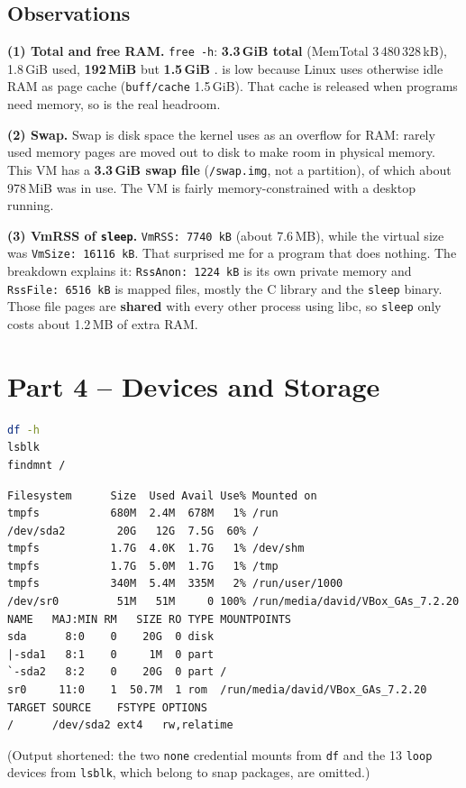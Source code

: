 \documentclass[12pt]{article}
\begin{document}
\subsection*{Observations}
\textbf{(1) Total and free RAM.} \texttt{free -h}: \textbf{3.3\,GiB total} (MemTotal 3\,480\,328\,kB), 1.8\,GiB used, \textbf{192\,MiB } but \textbf{1.5\,GiB }.  is low because Linux uses otherwise idle RAM as page cache (\texttt{buff/cache} 1.5\,GiB). That cache is released when programs need memory, so  is the real headroom.

\textbf{(2) Swap.} Swap is disk space the kernel uses as an overflow for RAM: rarely used memory pages are moved out to disk to make room in physical memory. This VM has a \textbf{3.3\,GiB swap file} (\texttt{/swap.img}, not a partition), of which about 978\,MiB was in use. The VM is fairly memory-constrained with a desktop running.

\textbf{(3) VmRSS of \texttt{sleep}.} \texttt{VmRSS: 7740 kB} (about 7.6\,MB), while the virtual size was \texttt{VmSize: 16116 kB}. That surprised me for a program that does nothing. The breakdown explains it: \texttt{RssAnon: 1224 kB} is its own private memory and \texttt{RssFile: 6516 kB} is mapped files, mostly the C library and the \texttt{sleep} binary. Those file pages are \textbf{shared} with every other process using libc, so \texttt{sleep} only costs about 1.2\,MB of extra RAM.

\section*{Part 4 -- Devices and Storage}
\begin{lstlisting}[language=bash]
df -h
lsblk
findmnt /
\end{lstlisting}
\begin{lstlisting}
Filesystem      Size  Used Avail Use% Mounted on
tmpfs           680M  2.4M  678M   1% /run
/dev/sda2        20G   12G  7.5G  60% /
tmpfs           1.7G  4.0K  1.7G   1% /dev/shm
tmpfs           1.7G  5.0M  1.7G   1% /tmp
tmpfs           340M  5.4M  335M   2% /run/user/1000
/dev/sr0         51M   51M     0 100% /run/media/david/VBox_GAs_7.2.20
NAME   MAJ:MIN RM   SIZE RO TYPE MOUNTPOINTS
sda      8:0    0    20G  0 disk
|-sda1   8:1    0     1M  0 part
`-sda2   8:2    0    20G  0 part /
sr0     11:0    1  50.7M  1 rom  /run/media/david/VBox_GAs_7.2.20
TARGET SOURCE    FSTYPE OPTIONS
/      /dev/sda2 ext4   rw,relatime
\end{lstlisting}
(Output shortened: the two \texttt{none} credential mounts from \texttt{df} and the 13 \texttt{loop} devices from \texttt{lsblk}, which belong to snap packages, are omitted.)
\end{document}
